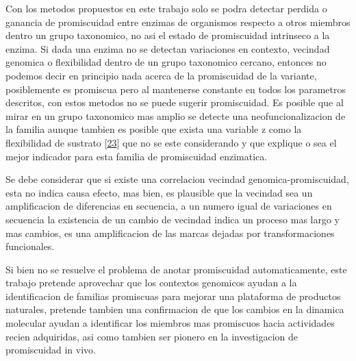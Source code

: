 \documentclass[12pt,twoside]{reedthesis}
\begin{document}
  Con los metodos propuestos en este trabajo solo se podra detectar
  perdida o ganancia de promiscuidad entre enzimas de organismos respecto
  a otros miembros dentro un grupo taxonomico, no asi el estado de
  promiscuidad intrinseco a la enzima. Si dada una enzima no se detectan
  variaciones en contexto, vecindad genomica o flexibilidad dentro de un
  grupo taxonomico cercano, entonces no podemos decir en principio nada
  acerca de la promiscuidad de la variante, posiblemente es promiscua pero
  al mantenerse constante en todos los parametros descritos, con estos
  metodos no se puede sugerir promiscuidad. Es posible que al mirar en un
  grupo taxonomico mas amplio se detecte una neofuncionalizacion de la
  familia aunque tambien es posible que exista una variable z como la
  flexibilidad de sustrato
  {[}\protect\hyperlink{ref-nobeliux5fproteinux5f2009}{23}{]} que no se
  este considerando y que explique o sea el mejor indicador para esta
  familia de promiscuidad enzimatica.
  
  Se debe considerar que si existe una correlacion vecindad
  genomica-promiscuidad, esta no indica causa efecto, mas bien, es
  plausible que la vecindad sea un amplificacion de diferencias en
  secuencia, a un numero igual de variaciones en secuencia la existencia
  de un cambio de vecindad indica un proceso mas largo y mas cambios, es
  una amplificacion de las marcas dejadas por transformaciones
  funcionales.
  
  Si bien no se resuelve el problema de anotar promiscuidad
  automaticamente, este trabajo pretende aprovechar que los contextos
  genomicos ayudan a la identificacion de familias promiscuas para mejorar
  una plataforma de productos naturales, pretende tambien una confirmacion
  de que los cambios en la dinamica molecular ayudan a identificar los
  miembros mas promiscuos hacia actividades recien adquiridas, asi como
  tambien ser pionero en la investigacion de promiscuidad in vivo.
  
\end{document}
